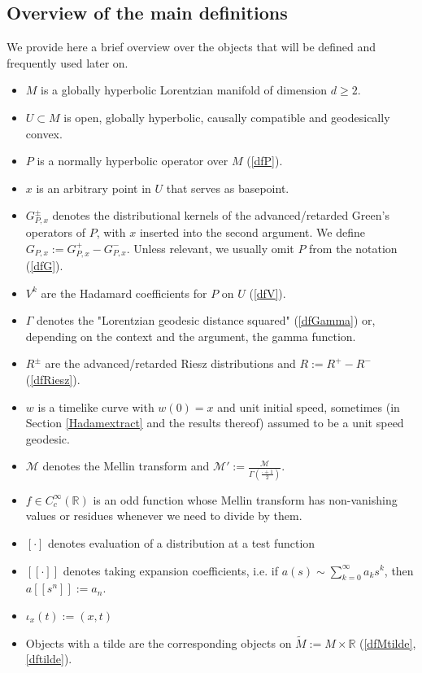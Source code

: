 \documentclass[11pt]{article}
\def\R{{\mathbb{R}}}
\def\insum#1{\sum\limits_{#1=0}^\infty}
\def\M{\mathcal{M}}
\begin{document}
\subsection{Overview of the main definitions}
\label{overview}
	We provide here a brief overview over the objects that will be defined and frequently used later on.
	\begin{itemize}
		\item $M$ is a globally hyperbolic Lorentzian manifold of dimension $d\geq 2$.
		\item $U\subset M$ is open, globally hyperbolic, causally compatible and geodesically convex.
		\item $P$ is a normally hyperbolic operator over $M$ (\ref{dfP}).
		\item $x$ is an arbitrary point in $U$ that serves as basepoint.
		\item $G^\pm_{P,x}$ denotes the distributional kernels of the advanced/retarded Green's operators of $P$, with $x$ inserted into the second argument. We define $G_{P,x}:=G^+_{P,x}-G^-_{P,x}$.
		Unless relevant, we usually omit $P$ from the notation (\ref{dfG}).
		\item $V^k$ are the Hadamard coefficients for $P$ on $U$ (\ref{dfV}).
		\item $\Gamma$ denotes the "Lorentzian geodesic distance squared" (\ref{dfGamma}) or, depending on the context and the argument, the gamma function.
		\item $R^\pm$ are the advanced/retarded Riesz distributions and $R:=R^+-R^-$ (\ref{dfRiesz}).
		\item $w$ is a timelike curve with $w(0)=x$ and unit initial speed, sometimes (in Section \ref{Hadamextract} and the results thereof) assumed to be a unit speed geodesic.
		\item $\M$ denotes the Mellin transform and $\M':=\frac{\M}{\Gamma(\tfrac{\cdot+1}{2})}$.
		\item $f\in C_c^\infty(\R)$ is an odd function whose Mellin transform has non-vanishing values or residues whenever we need to divide by them.
		\item $[\cdot]$ denotes evaluation of a distribution at a test function
		\item $[[\cdot]]$ denotes taking expansion coefficients, i.e. if $a(s)\sim \insum{k}a_ks^k$, then $a[[s^n]]:=a_n$.
		\item $\iota_x(t):=(x,t)$
		\item Objects with a tilde are the corresponding objects on $\tilde M:=M\times \R$ (\ref{dfMtilde}, \ref{dftilde}).
	\end{itemize}
\end{document}
